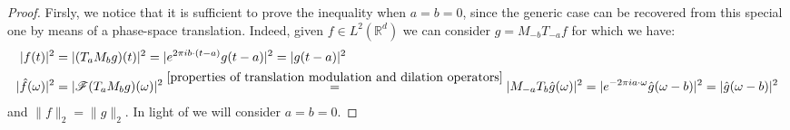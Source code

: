 \documentclass[corpo=11pt, stile=classica, tipotesi=custom,
greek, evenboxes, english]{toptesi}
\numberwithin{equation}{chapter}
\theoremstyle{remark}
\newcommand{\R}{\mathbb{R}} %
\newcommand{\F}{\mathscr{F}} %
\begin{document}
\begin{proof}
	Firsly, we notice that it is sufficient to prove the inequality when $a=b=0$, since the generic case can be recovered from this special one by means of a phase-space translation. Indeed, given $f \in L^2(\R^d)$ we can consider $g = M_{-b}T_{-a}f$ for which we have:
	\begin{align*}
		|f(t)|^2 &= |(T_a M_b g)(t)|^2 = |e^{2\pi i b \cdot (t-a)} g(t-a)|^2 = |g(t-a)|^2\\
		|\hat{f}(\omega)|^2 &= |\F(T_a M_b g)(\omega)|^2 \overset{\ref{properties of translation modulation and dilation operators}}{=} |M_{-a} T_b \hat{g}(\omega)|^2 = |e^{-2\pi i a \cdot \omega} \hat{g}(\omega - b)|^2 = |\hat{g}(\omega-b)|^2
	\end{align*}
	and $\|f\|_2 = \|g\|_2$. In light of we will consider $a=b=0$.
	

\end{proof}
\end{document}
